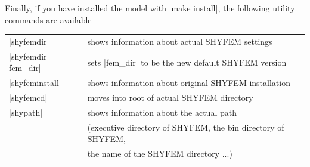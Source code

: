 \vspace{0.5cm}
Finally, if you have installed the model with |make install|,
the following utility commands are available \vspace{0.5cm}

\begin{center}
\begin{tabular}{ l l }
|shyfemdir|		&	shows information about actual SHYFEM
				settings \\
|shyfemdir fem_dir|	&	sets |fem_dir| to be the new default
				SHYFEM version \\
|shyfeminstall|		&	shows information about original SHYFEM
				installation \\
|shyfemcd|		&	moves into root of actual SHYFEM directory \\
|shypath|		&	shows information about the actual path \\
                        &       (executive directory of SHYFEM, the bin directory of SHYFEM, \\
                        &        the name of the SHYFEM directory ...) \\
\end{tabular}
\end{center}


